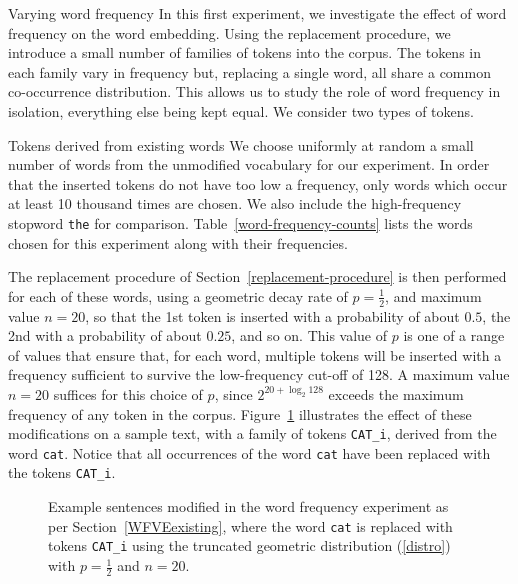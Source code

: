 \documentclass{article} %
\newcommand{\word}[1]{\texttt{#1}}
\begin{document}
\begin{section}{Varying word frequency}\label{WFVE}
In this first experiment, we investigate the effect of word frequency on
the word embedding.  Using the replacement procedure, we introduce a
small number of families of tokens into the corpus.  The tokens in each
family vary in frequency but, replacing a single word, all share a
common co-occurrence distribution.  This allows us to study the role of
word frequency in isolation, everything else being kept equal.  We
consider two types of tokens.

\begin{subsection}{Tokens derived from existing words}\label{WFVEexisting}
We choose uniformly at random a small number of words from the
unmodified vocabulary for our experiment.  In order that the inserted
tokens do not have too low a frequency, only words which occur at least
10 thousand times are chosen.  We also include the high-frequency
stopword \word{the} for comparison.  Table~\ref{word-frequency-counts}
lists the words chosen for this experiment along with their frequencies.

The replacement procedure of Section~\ref{replacement-procedure} is then
performed for each of these words, using a geometric decay rate of $p =
\tfrac{1}{2}$, and maximum value $n=20$, so that the 1st token is
inserted with a probability of about $0.5$, the 2nd with a probability of
about $0.25$, and so on.  This value of $p$ is one of a range of values
that ensure that, for each word, multiple tokens will be inserted with a
frequency sufficient to survive the low-frequency cut-off of
128.  A maximum value $n=20$ suffices for this choice of $p$, since
$2^{20 + \log_2{128}}$ exceeds the maximum frequency of any token in
the corpus.  Figure~\ref{fig:word-frequency-experiment-text-cat}
illustrates the effect of these modifications on a sample text, with a
family of tokens \word{CAT\_i}, derived from the word \word{cat}.
Notice that all occurrences of the word \word{cat} have been replaced
with the tokens \word{CAT\_i}.

\begin{table}
	
	\caption{Words chosen for the word frequency experiment, along with their frequency in the unmodified corpus. }
	\label{word-frequency-counts}
\end{table}

\begin{figure}
	\begin{mdframed}
	
	\end{mdframed}
	\caption{Example sentences modified in the word frequency
          experiment as per Section~\ref{WFVEexisting}, where the word
          \word{cat} is replaced with tokens \word{CAT\_i} using the
          truncated geometric distribution (\ref{distro}) with
          $p=\tfrac{1}{2}$ and $n=20$.}
	\label{fig:word-frequency-experiment-text-cat}
\end{figure}


\end{subsection}
\end{section}
\end{document}
